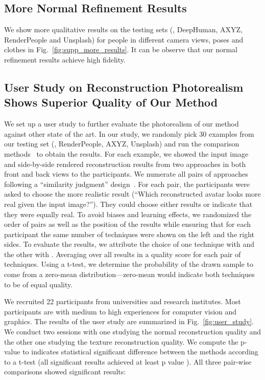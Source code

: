 \documentclass[10pt,twocolumn,letterpaper]{article}
\begin{document}
\subsection{More Normal Refinement Results}

We show more qualitative results on the testing sets (\eg, DeepHuman, AXYZ, RenderPeople and Unsplash) for people in different camera views, poses and clothes in Fig.~\ref{fig:supp_more_results}. It can be observe that our normal refinement results achieve high fidelity.

\subsection{User Study on Reconstruction Photorealism Shows Superior Quality of Our Method}

We set up a user study to further evaluate the photorealism of our method against other state of the art. In our study, we randomly pick \num{30} examples from our testing set (\ie, RenderPeople, AXYZ, Unsplash) and run the comparison methods~\cite{PIFuICCV19,huang2020arch,saito2020pifuhd} to obtain the results. For each example, we showed the input image and side-by-side rendered reconstruction results from two approaches in both front and back views to the participants. We numerate all pairs of approaches following a ``similarity judgment'' design~\cite{mantiuk2012comparison}. 
For each pair, the participants were asked to choose the more realistic result (``Which reconstructed avatar looks more real given the input image?''). They could choose either results or indicate that they were equally real.
To avoid biases and learning effects, we randomized the order of pairs as well as the position of the results while ensuring that for each participant the same number of techniques were shown on the left and the right sides.
To evaluate the results, we attribute the choice of one technique with  and the other with .
Averaging over all results in a quality score for each pair of techniques.
Using a t-test, we determine the probability of the drawn sample to come from a zero-mean distribution---zero-mean would indicate both techniques to be of equal quality.

We recruited 22 participants from universities and research institutes. Most participants are with medium to high experiences for computer vision and graphics. The results of the user study are summarized in Fig.~\ref{fig:user_study}. We conduct two sessions with one studying the normal reconstruction quality and the other one studying the texture reconstruction quality. We compute the p-value to indicates statistical significant difference between the methods according to a t-test (all significant results achieved at least p value ). All three pair-wise comparisons showed significant results:
\end{document}
